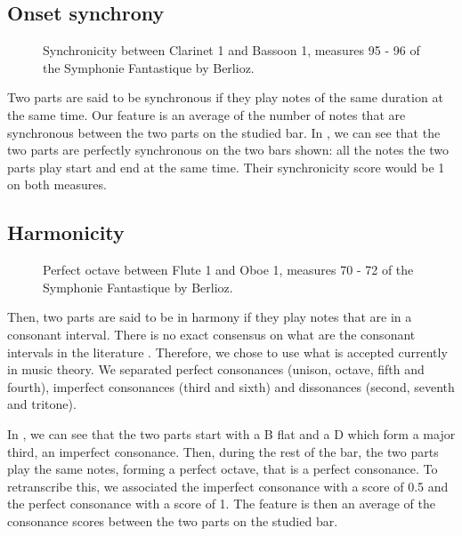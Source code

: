 \documentclass{article}
\begin{document}
\subsection{Onset synchrony}

\begin{figure}[ht]
  \centerline{}
  \caption{Synchronicity between Clarinet 1 and Bassoon 1, measures 95 - 96 of the Symphonie Fantastique by Berlioz.}
  \label{fig:sync}
\end{figure}


Two parts are said to be synchronous if they play notes of the same duration at the same time.
Our feature is an average of the number of notes that are synchronous between the two parts on the studied bar.
In , we can see that the two parts are perfectly synchronous on the two bars shown: all the notes the two parts play start and end at the same time.
Their synchronicity score would be 1 on both measures.

\subsection{Harmonicity}

\begin{figure}[ht]
  \centerline{}
  \caption{Perfect octave between Flute 1 and Oboe 1, measures 70 - 72 of the Symphonie Fantastique by Berlioz.}
  \label{fig:harm}
\end{figure}

Then, two parts are said to be in harmony if they play notes that are in a consonant interval.
There is no exact consensus on what are the consonant intervals in the literature \cite{consonance}.
Therefore, we chose to use what is accepted currently in music theory.
We separated perfect consonances (unison, octave, fifth and fourth), imperfect consonances (third and sixth) and dissonances (second, seventh and tritone).


In , we can see that the two parts start with a B flat and a D which form a major third, an imperfect consonance.
Then, during the rest of the bar, the two parts play the same notes, forming a perfect octave, that is a perfect consonance.
To retranscribe this, we associated the imperfect consonance with a score of 0.5 and the perfect consonance with a score of 1.
The feature is then an average of the consonance scores between the two parts on the studied bar.
\end{document}
